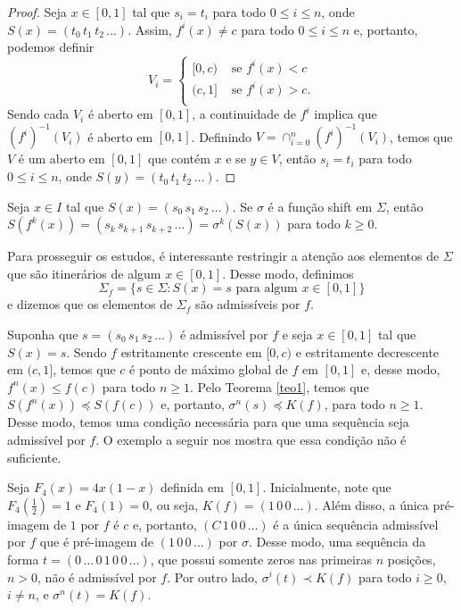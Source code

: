\begin{proof}
Seja $x \in [0, 1]$ tal que $s_i = t_i$ para todo $0 \leq i \leq n$, onde $S(x) = (t_0\, t_1\, t_2\, \dots)$. Assim, $f^i(x) \neq c$ para todo $0 \leq i \leq n$ e, portanto, podemos definir
\[ V_i = 
\begin{cases} 
  [0, c) & \textrm{ se } f^i(x) < c \\
  (c, 1] & \textrm{ se } f^i(x) > c. \\
\end{cases}
\]
Sendo cada $V_i$ é aberto em $[0, 1]$, a continuidade de $f^i$ implica que $(f^i)^{-1}(V_i)$ é aberto em $[0, 1]$. Definindo $V = \cap_{i=0}^n (f^i)^{-1}(V_i)$, temos que $V$ é um aberto em $[0, 1]$ que contém $x$ e se $y \in V$, então $s_i = t_i$ para todo $0 \leq i \leq n$, onde $S(y) = (t_0\, t_1\, t_2\, \dots)$.  
\end{proof}


Seja $x \in I$ tal que $S(x) = (s_0\, s_1\, s_2\, \dots)$. Se $\sigma$ é a função shift em $\Sigma$, então $S(f^k(x)) = (s_k\, s_{k+1}\, s_{k+2}\, \dots) = \sigma^k(S(x))$ para todo $k \geq 0$.

Para prosseguir os estudos, é interessante restringir a atenção aos elementos de $\Sigma$ que são itinerários de algum $x \in [0, 1]$. Desse modo, definimos
$$\Sigma_f = \{ s \in \Sigma : S(x) = s \text{ para algum } x \in [0, 1] \}$$
e dizemos que os elementos de $\Sigma_f$ são admissíveis por $f$.

Suponha que $s = (s_0\, s_1\, s_2\, \dots)$ é admissível por $f$ e seja $x \in [0, 1]$ tal que $S(x) = s$. Sendo $f$ estritamente crescente em $[0, c)$ e estritamente decrescente em $(c, 1]$, temos que $c$ é ponto de máximo global de $f$ em $[0, 1]$ e, desse modo, $f^n(x) \leq f(c)$ para todo $n \geq 1$. Pelo Teorema \ref{teo1}, temos que $S(f^n(x)) \preceq S(f(c))$ e, portanto, $\sigma^n(s) \preceq K(f)$, para todo $n \geq 1$. Desse modo, temos uma condição necessária para que uma sequência seja admissível por $f$. O exemplo a seguir nos mostra que essa condição não é suficiente.

\begin{example}
Seja $F_4(x) = 4x(1-x)$ definida em $[0, 1]$. Inicialmente, note que $F_4\left(\frac{1}{2}\right) = 1$ e $F_4(1) = 0$, ou seja, $K(f) = (1\, 0\, 0\, \dots)$. Além disso, a única pré-imagem de $1$ por $f$ é $c$ e, portanto, $(C\, 1\, 0\, 0\, \dots)$ é a única sequência admissível por $f$ que é pré-imagem de $(1\, 0\, 0\, \dots)$ por $\sigma$. Desse modo, uma sequência da forma $t = (0\, \dots\, 0\, 1\, 0\, 0\, \dots)$, que possui somente zeros nas primeiras $n$ posições, $n > 0$, não é admissível por $f$. Por outro lado, $\sigma^i(t) \prec K(f)$ para todo $i \geq 0$, $i \neq n$, e $\sigma^n(t) = K(f)$. 
\end{example}

